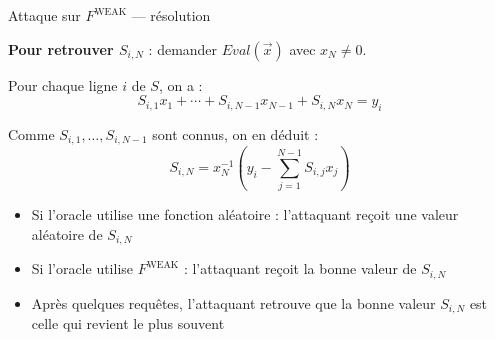 \documentclass{beamer}
\begin{document}
\begin{frame}{Attaque sur $F^{\mathrm{WEAK}}$ --- résolution}

\textbf{Pour retrouver $S_{i,N}$} : demander $\mathit{Eval}(\vec{x})$ avec $x_N \neq 0$.

Pour chaque ligne $i$ de $S$, on a :
\[
S_{i,1} x_1 + \cdots + S_{i,N-1} x_{N-1} + S_{i,N} x_N = y_i
\]

Comme $S_{i,1}, \ldots, S_{i,N-1}$ sont connus, on en déduit :
\[
S_{i,N} = x_N^{-1}\left(y_i - \sum_{j=1}^{N-1} S_{i,j} x_j\right)
\]


\vspace{0.3cm}

\begin{itemize}
    \item Si l'oracle utilise une fonction aléatoire : l'attaquant reçoit une valeur aléatoire de $S_{i,N}$
    \item Si l'oracle utilise $F^{\mathrm{WEAK}}$ : l'attaquant reçoit la bonne valeur de $S_{i,N}$
    \item Après quelques requêtes, l'attaquant retrouve que la bonne valeur $S_{i,N}$ est celle qui revient le plus souvent
\end{itemize}



\end{frame}
\end{document}
